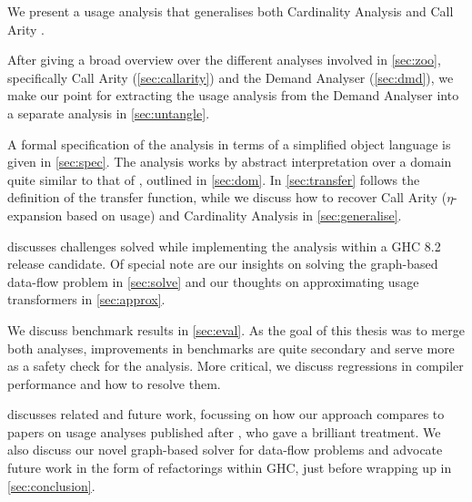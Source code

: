 We present a usage analysis that generalises both Cardinality Analysis \parencite{card} and Call Arity \parencite{callarity}.

After giving a broad overview over the different analyses involved in \cref{sec:zoo}, specifically Call Arity (\cref{sec:callarity}) and the Demand Analyser (\cref{sec:dmd}), we make our point for extracting the usage analysis from the Demand Analyser into a separate analysis in \ref{sec:untangle}.

A formal specification of the analysis in terms of a simplified object language is given in \cref{sec:spec}.
The analysis works by abstract interpretation over a domain quite similar to that of \textcite{card}, outlined in \cref{sec:dom}.
In \cref{sec:transfer} follows the definition of the transfer function, while we discuss how to recover Call Arity (\eg $\eta$-expansion based on usage) and Cardinality Analysis in \cref{sec:generalise}.

 discusses challenges solved while implementing the analysis within a GHC 8.2 release candidate.
Of special note are our insights on solving the graph-based data-flow problem in \cref{sec:solve} and our thoughts on approximating usage transformers in \cref{sec:approx}.

We discuss benchmark results in \cref{sec:eval}.
As the goal of this thesis was to merge both analyses, improvements in benchmarks are quite secondary and serve more as a safety check for the analysis.
More critical, we discuss regressions in compiler performance and how to resolve them.

 discusses related and future work, focussing on how our approach compares to papers on usage analyses published after \textcite{card}, who gave a brilliant treatment.
We also discuss our novel graph-based solver for data-flow problems and advocate future work in the form of refactorings within GHC, just before wrapping up in \cref{sec:conclusion}.

